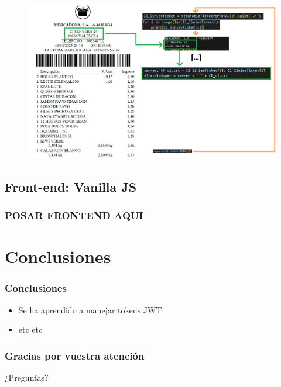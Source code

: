 \documentclass{beamer}
\begin{document}
		\begin{frame}
			\begin{figure}
				\centering
				\includegraphics[width=1\linewidth]{imgEspecifiques/ticketExtraccioH.png}
				\label{fig:ticketExtraccioH}
			\end{figure}
		\end{frame}
			
	
	
	
	
	
	
	
	
	
	
	
	
	
	
		\subsection{Front-end: Vanilla JS}
		
		\begin{frame}
			\frametitle{POSAR FRONTEND AQUI}
			
			
		\end{frame}
	
	
	
	
	
	
	
	
	
	
	
	
	
	
	
	
	
	
	
	
	
	
	
	
	
	
	
	\section{Conclusiones}
	
	\begin{frame}
		\frametitle{Conclusiones}
		\begin{itemize}
			\item Se ha aprendido a manejar tokens JWT
			\item etc etc
		\end{itemize}
	\end{frame}
	
	\begin{frame}
		\frametitle{Gracias por vuestra atención}
		¿Preguntas?
	\end{frame}
	
	
	
	
	
	
	
	
	
\end{document}
